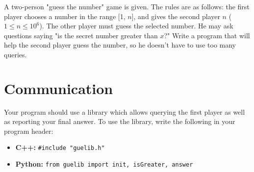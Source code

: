 \documentclass{spiral}
\begin{document}
    \makeheader

    A two-person "guess the number" game is given.
    The rules are as follows:
    the first player chooses a number in the range [1, $n$],
    and gives the second player $n$ ($1 \leq n \leq 10^6$).
    The other player must guess the selected number. 
    He may ask questions saying "is the secret number greater than $x$?"
    Write a program that will help the second player guess the number,
    so he doesn't have to use too many queries.

\section{Communication}

    Your program should use a library which allows querying the first player
    as well as reporting your final answer.
    To use the library, write the following in your program header:
    \begin{itemize}
        \item \textbf{C++:}
            \verb|#include "guelib.h"|

        \item \textbf{Python:}
            \texttt{from guelib import init, isGreater, answer}
    \end{itemize}
\end{document}
